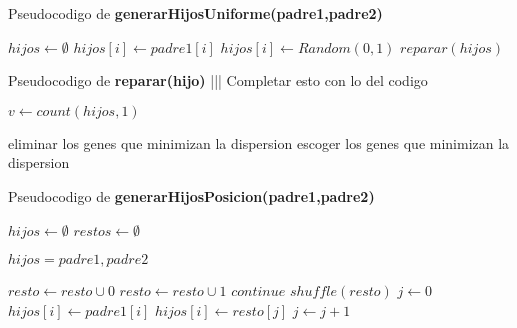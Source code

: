 Pseudocodigo de \textbf{generarHijosUniforme(padre1,padre2)}
\begin{algorithm}[H]
  \begin{algorithmic}[1]
      \State $hijos \gets \emptyset$
          \State $hijos[i] \gets padre1[i]$
      \Else
          \State $hijos[i] \gets Random(0,1)$
      \EndIf
      \EndFor
      \State $reparar(hijos)$
      \State {}
    \EndFunction
  \end{algorithmic}
\end{algorithm}

Pseudocodigo de \textbf{reparar(hijo)}  ||| Completar esto con lo del codigo 
\begin{algorithm}[H]
  \begin{algorithmic}[1]
      \State $v \gets count(hijos,1)$
      
        \State {}
       
          \State eliminar los genes que minimizan la dispersion
        \EndWhile
       
          \State escoger los genes que minimizan la dispersion
        \EndWhile
      \EndIf

      \State {}
    \EndFunction
  \end{algorithmic}
\end{algorithm}

Pseudocodigo de \textbf{generarHijosPosicion(padre1,padre2)}
\begin{algorithm}[H]
  \begin{algorithmic}[1]
      \State $hijos \gets \emptyset$
      \State $restos \gets \emptyset$

        \State $hijos = padre1,padre2$  
      \EndIf

            \State $resto \gets resto \cup 0$
            \State $resto \gets resto \cup 1$
          \EndIf
        \Else
          \State$continue$
        \EndIf
      \EndFor
      \State $shuffle(resto)$
      \State $j \gets 0$
            \State $hijos[i] \gets padre1[i] $
        \Else
            \State $hijos[i] \gets resto[j] $
            \State $j \gets j +1$
        \EndIf
      \EndFor

      \State {}
    \EndFunction
  \end{algorithmic}
\end{algorithm}

